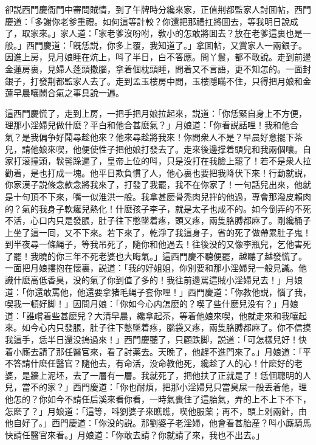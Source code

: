 卻説西門慶衙門中審問賊情，到了午牌時分纔來家，正值荆都監家人討囬帖，西門慶道：「多謝你老爹重禮。如何這等計較？你還把那禮扛將囬去，等我明日說成了，取家來。」家人道：「家老爹沒吩咐，敎小的怎敢將囬去？放在老爹這裏也是一般。」西門慶道：「旣恁説，你多上覆，我知道了。」拿囬帖，又賞家人一兩銀子。因進上房，見月娘睡在炕上，呌了半日，白不答應。問丫鬟，都不敢說。走到前邊金蓮房裏，見婦人蓬頭撒腦，拿着個枕頭睡，問着又不言語，更不知怎的。一面封銀子，打發荆都監家人去了。走到孟玉樓房中問，玉樓隱瞞不住，只得把月娘和金蓮早晨嚷鬧合氣之事具說一遍。

這西門慶慌了，走到上房，一把手把月娘拉起來，説道：「你恁緊自身上不方便，理那小淫婦兒做什麽？平白和他合甚麽氣？」月娘道：「你看説話哩！我和他合氣？是我偏争好鬦尋趁他來？他來尋趁將我來！你問衆人不是？早晨好意擺下茶兒，請他娘來喫，他便使性子把他娘打發去了。走來後邊撑着頭兒和我兩個嚷。自家打滚撞頭，䯼髻跺遍了，皇帝上位的呌，只是没打在我臉上罷了！若不是衆人拉勸着，是也打成一塊。他平日欺負慣了人，他心裏也要把我降伏下來！行動就説，你家漢子説條念款念將我來了，打發了我罷，我不在你家了！一句話兒出來，他就是十句頂不下來，嘴一似淮洪一般。我拿甚麽骨秃肉兒拌的他過，專會那潑皮賴肉的？氣的我身子軟癱兒熱化！什麽孩子李子，就是太子也成不的。如今倒弄的不死不活，心口内只是發脹，肚子往下憋墜着疼，頭又疼，兩隻胳膊都麻了。剛纔桶子上坐了這一囘，又不下來。若下來了，乾淨了我這身子，省的死了做帶累肚子鬼！到半夜尋一條䋲子，等我吊死了，隨你和他過去！往後没的又像李瓶兒，乞他害死了罷！我曉的你三年不死老婆也大晦氣。」這西門慶不聽便罷，越聽了越發慌了。一面把月娘摟抱在懷裏，説道：「我的好姐姐，你別要和那小淫婦兒一般見識。他識什麽高低香臭，没的氣了你到值了多的！我往前邊駡這賊小淫婦兒去！」月娘道：「你還敢罵他，他還要拿猪毛䋲子套你哩！」西門慶道：「你教他説，惱了我，喫我一頓好脚！」因問月娘：「你如今心内怎麽的？喫了些什麽兒没有？」月娘道：「誰嚐着些甚麽兒？大清早晨，纔拿起茶，等着他娘來喫，他就走來和我嚷起來。如今心内只發脹，肚子往下憋墜着疼，腦袋又疼，兩隻胳膊都麻了。你不信摸我這手，恁半日還没摀過來！」西門慶聽了，只顧跌脚，説道：「可怎樣兒好！快着小廝去請了那任醫官來，看了討薬去。天晚了，他趕不進門來了。」月娘道：「平不答請什麽任醫官？隨他去，有命活，没命教他死，纔趁了人的心！什麽好的老婆，是牆上泥坯，去了一層有一層。我就死了，把他扶了正就是了！恁個聰明的人兒，當不的家？」西門慶道：「你也耐煩，把那小淫婦兒只當臭屎一般丢着他，理他怎的？你如今不請任后溪來看你看，一時氣裹住了這胎氣，弄的上不上下不下，怎麽了？」月娘道：「這等，呌劉婆子來瞧瞧，喫他服薬；再不，頭上剁兩針，由他自好了。」西門慶道：「你没的説。那劉婆子老淫婦，他會看甚胎産？呌小廝騎馬快請任醫官來看。」月娘道：「你敢去請？你就請了來，我也不出去。」

